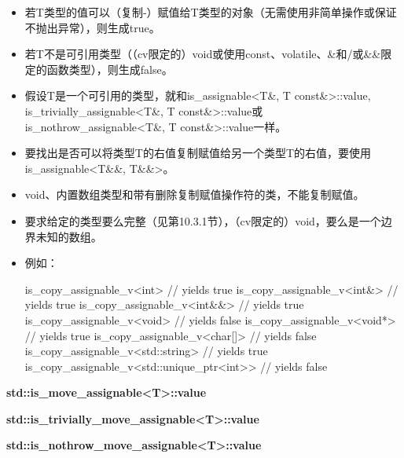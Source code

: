 \begin{itemize}
\item
若T类型的值可以（复制-）赋值给T类型的对象（无需使用非简单操作或保证不抛出异常），则生成true。

\item
若T不是可引用类型（（cv限定的）void或使用const、volatile、\&和/或\&\&限定的函数类型），则生成false。
 
\item
假设T是一个可引用的类型，就和is\_assignable<T\&, T const\&>::value, is\_trivially\_assignable<T\&, T const\&>::value或is\_nothrow\_assignable<T\&, T const\&>::value一样。

\item
要找出是否可以将类型T的右值复制赋值给另一个类型T的右值，要使用is\_assignable<T\&\&, T\&\&>。

\item
void、内置数组类型和带有删除复制赋值操作符的类，不能复制赋值。

\item
要求给定的类型要么完整（见第10.3.1节），（cv限定的）void，要么是一个边界未知的数组。

\item
例如：
\begin{cpp}
is_copy_assignable_v<int> // yields true
is_copy_assignable_v<int&> // yields true
is_copy_assignable_v<int&&> // yields true
is_copy_assignable_v<void> // yields false
is_copy_assignable_v<void*> // yields true
is_copy_assignable_v<char[]> // yields false
is_copy_assignable_v<std::string> // yields true
is_copy_assignable_v<std::unique_ptr<int>> // yields false
\end{cpp}
\end{itemize}

\textbf{std::is\_move\_assignable<T>::value}

\textbf{std::is\_trivially\_move\_assignable<T>::value}

\textbf{std::is\_nothrow\_move\_assignable<T>::value}

